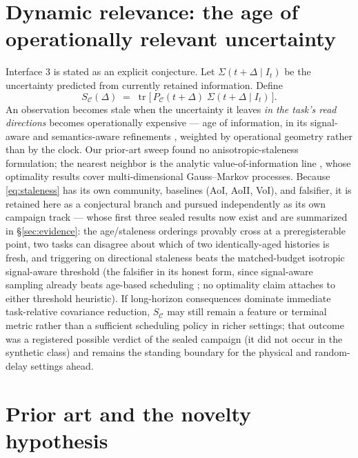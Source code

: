 \documentclass[letterpaper,onecolumn]{IEEEtran}
\theoremstyle{definition}
\theoremstyle{remark}
\newcommand{\PC}{P_{\mathcal{C}}}
\newcommand{\tr}{\operatorname{tr}}
\newcommand{\Sig}{\Sigma}
\newcommand{\SC}{S_{\mathcal{C}}}
\begin{document}
\section{Dynamic relevance: the age of operationally relevant uncertainty}
\label{sec:staleness}

Interface 3 is stated as an explicit conjecture. Let $\Sig(t{+}\Delta\mid
I_t)$ be the uncertainty predicted from currently retained information.
Define
\begin{equation}
\label{eq:staleness}
\SC(\Delta)\;=\;\tr\!\big[\,\PC(t{+}\Delta)\;\Sig(t{+}\Delta\mid I_t)\,\big].
\end{equation}
An observation becomes stale when the uncertainty it leaves \emph{in the
task's read directions} becomes operationally expensive --- age of
information, in its signal-aware and semantics-aware refinements
\cite{sun2020,maatouk2022}, weighted by operational geometry
rather than by the clock. Our prior-art sweep found no anisotropic-staleness
formulation; the nearest neighbor is the analytic value-of-information
line \cite{soleymani2022}, whose optimality results cover
multi-dimensional Gauss--Markov processes. Because \eqref{eq:staleness}
has its own community, baselines (AoI, AoII, VoI), and falsifier, it is
retained here as a conjectural branch and pursued independently as its
own campaign track --- whose first three sealed results now exist and
are summarized in \S\ref{sec:evidence}: the age/staleness orderings
provably cross at a preregisterable point, two tasks can disagree
about which of two identically-aged histories is fresh, and triggering
on directional staleness beats the matched-budget isotropic
signal-aware threshold (the falsifier in its honest form, since
signal-aware sampling already beats age-based scheduling
\cite{sun2020}; no optimality claim attaches to either threshold
heuristic). If long-horizon consequences dominate immediate
task-relative covariance reduction, $\SC$ may still remain a feature
or terminal metric rather than a sufficient scheduling policy in richer
settings; that outcome was a registered possible verdict of the sealed
campaign (it did not occur in the synthetic class) and remains the
standing boundary for the physical and random-delay settings ahead.

\section{Prior art and the novelty hypothesis}
\label{sec:priorart}
\end{document}
